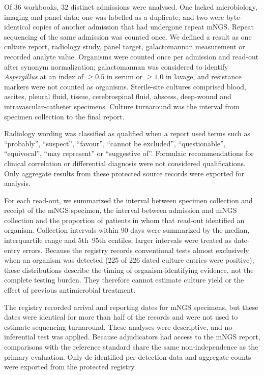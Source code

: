 \documentclass[11pt,a4paper]{article}
\newcommand{\mngs}{mNGS\xspace}
\begin{document}
Of 36 workbooks, 32 distinct admissions were analysed. One lacked microbiology, imaging and panel data; one was labelled as a duplicate; and two were byte-identical copies of another admission that had undergone repeat \mngs. Repeat sequencing of the same admission was counted once. We defined a result as one culture report, radiology study, panel target, galactomannan measurement or recorded analyte value. Organisms were counted once per admission and read-out after synonym normalization; galactomannan was considered to identify \textit{Aspergillus} at an index of $\geq0.5$ in serum or $\geq1.0$ in lavage, and resistance markers were not counted as organisms. Sterile-site cultures comprised blood, ascites, pleural fluid, tissue, cerebrospinal fluid, abscess, deep-wound and intravascular-catheter specimens. Culture turnaround was the interval from specimen collection to the final report.

Radiology wording was classified as qualified when a report used terms such as ``probably'', ``suspect'', ``favour'', ``cannot be excluded'', ``questionable'', ``equivocal'', ``may represent'' or ``suggestive of''. Formulaic recommendations for clinical correlation or differential diagnosis were not considered qualifications. Only aggregate results from these protected source records were exported for analysis.

For each read-out, we summarized the interval between specimen collection and receipt of the \mngs specimen, the interval between admission and \mngs collection and the proportion of patients in whom that read-out identified an organism. Collection intervals within 90 days were summarized by the median, interquartile range and 5th--95th centiles; larger intervals were treated as date-entry errors. Because the registry records conventional tests almost exclusively when an organism was detected (225 of 226 dated culture entries were positive), these distributions describe the timing of organism-identifying evidence, not the complete testing burden. They therefore cannot estimate culture yield or the effect of previous antimicrobial treatment.

The registry recorded arrival and reporting dates for \mngs specimens, but these dates were identical for more than half of the records and were not used to estimate sequencing turnaround. These analyses were descriptive, and no inferential test was applied. Because adjudicators had access to the \mngs report, comparisons with the reference standard share the same non-independence as the primary evaluation. Only de-identified per-detection data and aggregate counts were exported from the protected registry.
\end{document}
